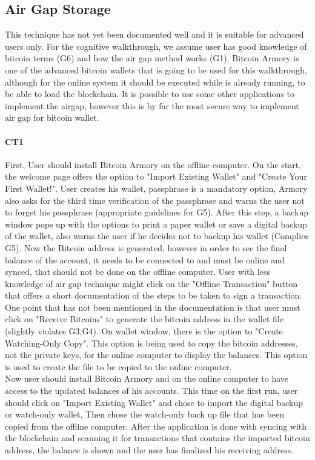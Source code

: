 
\subsection{Air Gap Storage}
\label{air gap}
This technique has not yet been documented well and it is suitable for advanced users only. For the cognitive walkthrough, we assume user has good knowledge of bitcoin terms (G6) and how the air gap method works (G1). Bitcoin Armory is one of the advanced bitcoin wallets that is going to be used for this walkthrough, although for the online system it should be executed while \bitcoinclient is already running, to be able to load the blockchain. It is possible to use some other applications to implement the airgap, however this is by far the most secure way to implement air gap for bitcoin wallet.

\paragraph{CT1} 
First, User should install Bitcoin Armory on the offline computer. On the start, the welcome page offers the option to "Import Existing Wallet" and "Create Your First Wallet!". User creates his wallet, passphrase is a mandatory option, Armory also asks for the third time verification of the passphrase and warns the user not to forget his passphrase (appropriate guidelines for G5). After this step, a backup window pops up with the options to print a paper wallet or save a digital backup of the wallet, also warns the user if he decides not to backup his wallet (Complies G5). Now the Bitcoin address is generated, however in order to see the final balance of the account, it needs to be connected to \bitcoinclient and \bitcoinclient must be online and synced, that should not be done on the offline computer. User with less knowledge of air gap technique might click on the "Offline Transaction" button that offers a short documentation of the steps to be taken to sign a transaction. One point that has not been mentioned in the documentation is that user must click on "Receive Bitcoins" to generate the bitcoin address in the wallet file (slightly violates G3,G4). On wallet window, there is the option to "Create Watching-Only Copy". This option is being used to copy the bitcoin addresses, not the private keys, for the online computer to display the balances. This option is used to create the file to be copied to the online computer.\\
Now user should install Bitcoin Armory and \bitcoinclient on the online computer to have access to the updated balances of his accounts. This time on the first run, user should click on "Import Existing Wallet" and chose to import the digital backup or watch-only wallet, Then chose the watch-only back up file that has been copied from the offline computer. After the application is done with syncing with the blockchain and scanning it for transactions that contains the imported bitcoin address, the balance is shown and the user has finalized his receiving address.


